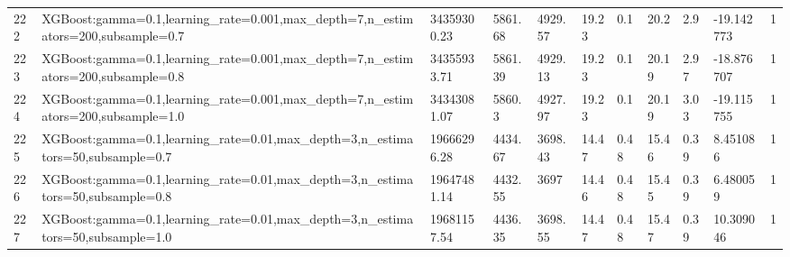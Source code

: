 \begin{longtable}{C{0.8cm} L{2cm} C{1.15cm} C{1.15cm} C{1.15cm} C{1.15cm} C{0.85cm} C{1.25cm} C{1.2cm} C{1.5cm} C{1.0cm}}
222 & XGBoost:\newline gamma=0.1,\newline learning\_rate=0.001,\newline max\_depth=7,\newline n\_estimators=200,\newline subsample=0.7 & 34359300.23 & 5861.68 & 4929.57 & 19.23 & 0.1 & 20.2 & 2.9 & -19.142773 & 1 \\
223 & XGBoost:\newline gamma=0.1,\newline learning\_rate=0.001,\newline max\_depth=7,\newline n\_estimators=200,\newline subsample=0.8 & 34355933.71 & 5861.39 & 4929.13 & 19.23 & 0.1 & 20.19 & 2.97 & -18.876707 & 1 \\
224 & XGBoost:\newline gamma=0.1,\newline learning\_rate=0.001,\newline max\_depth=7,\newline n\_estimators=200,\newline subsample=1.0 & 34343081.07 & 5860.3 & 4927.97 & 19.23 & 0.1 & 20.19 & 3.03 & -19.115755 & 1 \\
225 & XGBoost:\newline gamma=0.1,\newline learning\_rate=0.01,\newline max\_depth=3,\newline n\_estimators=50,\newline subsample=0.7 & 19666296.28 & 4434.67 & 3698.43 & 14.47 & 0.48 & 15.46 & 0.39 & 8.451086 & 1 \\
226 & XGBoost:\newline gamma=0.1,\newline learning\_rate=0.01,\newline max\_depth=3,\newline n\_estimators=50,\newline subsample=0.8 & 19647481.14 & 4432.55 & 3697 & 14.46 & 0.48 & 15.45 & 0.39 & 6.480059 & 1 \\
227 & XGBoost:\newline gamma=0.1,\newline learning\_rate=0.01,\newline max\_depth=3,\newline n\_estimators=50,\newline subsample=1.0 & 19681157.54 & 4436.35 & 3698.55 & 14.47 & 0.48 & 15.47 & 0.39 & 10.309046 & 1 \\

\end{longtable}
